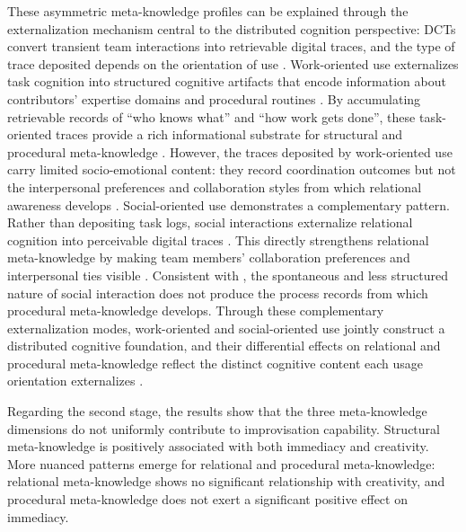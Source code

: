 \documentclass[authoryear,preprint,review,times,10pt]{elsarticle}
\begin{document}
These asymmetric meta-knowledge profiles can be explained through the externalization mechanism central to the distributed cognition perspective: DCTs convert transient team interactions into retrievable digital traces, and the type of trace deposited depends on the orientation of use \citep{treem2020ComputerMediated, leonardi2014Social}. Work-oriented use externalizes task cognition into structured cognitive artifacts that encode information about contributors' expertise domains and procedural routines \citep{drury-grogan2021Changes, cho2022Digital}. By accumulating retrievable records of ``who knows what'' and ``how work gets done'', these task-oriented traces provide a rich informational substrate for structural and procedural meta-knowledge \citep{engelbrecht2019How}. However, the traces deposited by work-oriented use carry limited socio-emotional content: they record coordination outcomes but not the interpersonal preferences and collaboration styles from which relational awareness develops \citep{palazzolo2006Coevolution}. Social-oriented use demonstrates a complementary pattern. Rather than depositing task logs, social interactions externalize relational cognition into perceivable digital traces \citep{brockhaus2023Digitalization}. This directly strengthens relational meta-knowledge by making team members' collaboration preferences and interpersonal ties visible \citep{leonardi2015Ambient}. Consistent with \citet{fu2025Enterprise}, the spontaneous and less structured nature of social interaction does not produce the process records from which procedural meta-knowledge develops. Through these complementary externalization modes, work-oriented and social-oriented use jointly construct a distributed cognitive foundation, and their differential effects on relational and procedural meta-knowledge reflect the distinct cognitive content each usage orientation externalizes \citep{hutchins2020Distributed}.

Regarding the second stage, the results show that the three meta-knowledge dimensions do not uniformly contribute to improvisation capability. Structural meta-knowledge is positively associated with both immediacy and creativity. More nuanced patterns emerge for relational and procedural meta-knowledge: relational meta-knowledge shows no significant relationship with creativity, and procedural meta-knowledge does not exert a significant positive effect on immediacy.
\end{document}
